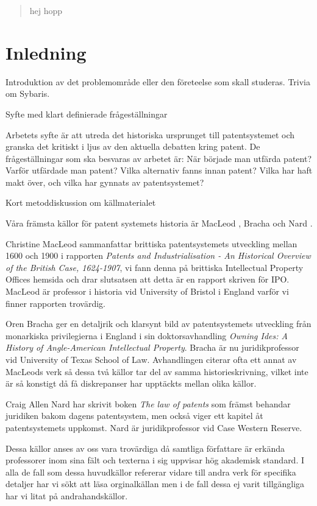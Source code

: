 
\begin{abstract}
	hej hopp
\end{abstract}	
	
	
\section{Inledning}
Introduktion av det problemområde eller den företeelse som skall studeras. 
Trivia om Sybaris.

Syfte med klart definierade frågeställningar

Arbetets syfte är att utreda det historiska ursprunget till patentsystemet och
granska det kritiskt i ljus av den aktuella debatten kring patent.
De frågeställningar som ska besvaras av arbetet är: När började man utfärda
patent? Varför utfärdade man patent? Vilka alternativ fanns innan 
patent? Vilka har haft makt över, och vilka har gynnats av patentsystemet?


Kort metoddiskussion om källmaterialet

Våra främsta källor för patent systemets historia är MacLeod \cite{macleod}, Bracha \cite{bracha} och Nard
\cite{nard}.

Christine MacLeod sammanfattar brittiska patentsystemets utveckling mellan 
1600 och 1900 i rapporten \emph{Patents and Industrialisation - An Historical 
Overview of the British Case, 1624-1907}, vi fann denna på brittiska 
Intellectual Property Offices hemsida och drar slutsatsen att detta är en 
rapport skriven för IPO. MacLeod är professor i historia vid University of 
Bristol i England varför vi finner rapporten trovärdig.

Oren Bracha ger en detaljrik och klarsynt bild av patentsystemets utveckling 
från monarkiska privilegierna i England i sin doktorsavhandling \emph{Owning 
Ides: A History of Angle-American Intellectual Property}. Bracha är nu 
juridikprofessor vid University of Texas School of Law. Avhandlingen citerar 
ofta ett annat av MacLeods verk så dessa två källor tar del av samma 
historieskrivning, vilket inte är så konstigt då få diskrepanser har upptäckts 
mellan olika källor.

Craig Allen Nard har skrivit boken \emph{The law of patents} som främst 
behandar juridiken bakom dagens patentsystem, men också viger ett kapitel åt 
patentsystemets uppkomst. Nard är juridikprofessor vid Case Western Reserve.

Dessa källor anses av oss vara trovärdiga då samtliga författare är erkända 
professorer inom sina fält och texterna i sig uppvisar hög akademisk standard. 
I alla de fall som dessa huvudkällor refererar vidare till andra verk för 
specifika detaljer har vi sökt att läsa orginalkällan men i de fall dessa ej 
varit tillgängliga har vi litat på andrahandskällor.

